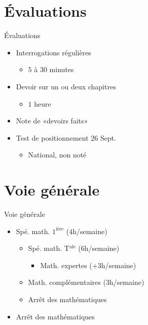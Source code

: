 \documentclass[17pt,xcolor=x11names]{beamer}
\begin{document}
\section*{Évaluations}
\begin{frame}{Évaluations}
  \begin{itemize}
    \item Interrogations régulières 
      \begin{itemize}
        \item $5$ à $30$ minutes
      \end{itemize}
    \item Devoir sur un ou deux chapitres
      \begin{itemize}
        \item $1$ heure
      \end{itemize}
    \item Note de «devoirs faits»
    \item Test de positionnement 26 Sept.
      \begin{itemize}
        \item National, non noté
      \end{itemize}
  \end{itemize}
\end{frame}

\section*{Voie générale}
\begin{frame}{Voie générale}
  \begin{itemize}
    \item Spé. math. $1^\text{ière}$ ($4$h/semaine)
      \begin{itemize}
        \item Spé. math. T$^\text{ale}$ ($6$h/semaine)
          \begin{itemize}
              \item Math. expertes ($+3$h/semaine)
          \end{itemize}
        \item Math. complémentaires ($3$h/semaine)
        \item Arrêt des mathématiques
      \end{itemize}
    \item Arrêt des mathématiques
  \end{itemize}
\end{frame}
\end{document}
